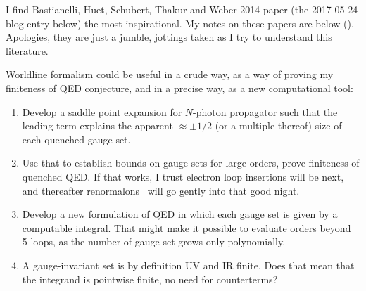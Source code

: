  I find
Bastianelli, Huet, Schubert, Thakur and Weber 2014 paper (the
{2017-05-24} blog entry below) the most inspirational.
My notes on these papers are below ().
Apologies, they are just a jumble, jottings taken as I try to understand
this literature.


Worldline formalism could be useful in a crude way, as a way of proving
my finiteness of QED conjecture, and in a precise way, as a new
computational tool:
    \begin{enumerate}
  \item
Develop a saddle point expansion for $N$-photon propagator such that the
leading term explains the apparent $\approx \pm 1/2$ (or a multiple
thereof) size of each quenched gauge-set.
  \item
Use that to establish bounds on gauge-sets for large orders, prove
finiteness of quenched QED. If that works, I trust electron loop
insertions will be next, and thereafter renormalons \etc\ will go
{gently into that good night}.
  \item
Develop a new formulation of QED in which each gauge set is given by a
computable integral. That might make it possible to evaluate orders
beyond 5-loops, as the number of gauge-set grows only polynomially.
  \item
A gauge-invariant set is by definition UV and IR finite. Does that mean
that the integrand is pointwise finite, no need for counterterms?
    \end{enumerate}
